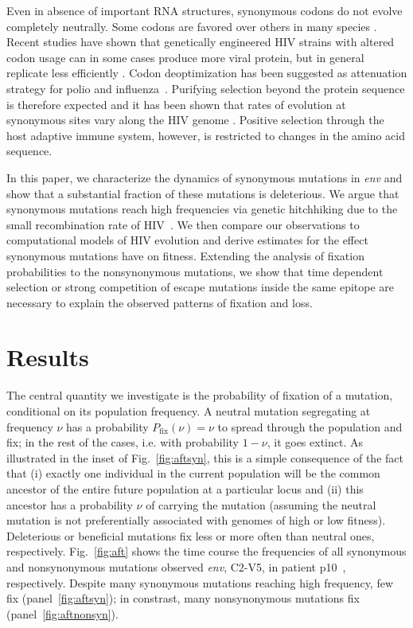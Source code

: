 \documentclass[rmp, twocolumn]{revtex4}
\newcommand{\pfix}{P_{\mathrm{fix}}}
\newcommand{\FIG}[1]{Fig.~\ref{fig:#1}}
\newcommand{\env}{\textit{env}}
\newcommand{\shankaregion}{C2-V5}
\begin{document}
Even in absence of important RNA structures, synonymous codons do not evolve
completely neutrally. Some codons are favored over others in many species
\citep{plotkin_synonymous_2011}. Recent studies have shown that genetically
engineered HIV strains with altered codon usage can in some cases produce more
viral protein, but in general replicate less efficiently
\citep{ngumbela_quantitative_2008, li_codon-usage-based_2012,
keating_rich_2009}. Codon deoptimization has been suggested as attenuation
strategy for polio and influenza~\citep{mueller_live_2010,coleman_virus_2008}.
Purifying selection beyond the protein sequence is therefore expected
\citep{forsdyke_reciprocal_1995,snoeck_mapping_2011} and it has been shown that
rates of evolution at synonymous sites vary along the HIV genome
\citep{mayrose_towards_2007}. Positive selection through the host adaptive
immune system, however, is restricted to changes in the amino acid sequence.

In this paper, we characterize the dynamics of synonymous mutations in \env{}
and show that a substantial fraction of these mutations is deleterious.  We
argue that synonymous mutations reach high frequencies via genetic hitchhiking
due to the small recombination rate of HIV~\citep{neher_recombination_2010,
batorsky_estimate_2011}. We then compare our observations to computational
models of HIV evolution and derive estimates for the effect synonymous mutations
have on fitness.  Extending the analysis of fixation probabilities to the
nonsynonymous mutations, we show that time dependent selection or strong
competition of escape mutations inside the same epitope are necessary to explain
the observed patterns of fixation and loss.

\section{Results}
The central quantity we investigate is the probability of fixation of a
mutation, conditional on its population frequency. A neutral mutation
segregating at frequency $\nu$ has a probability $\pfix(\nu) = \nu$ to
spread through the population and fix; in the rest of the cases, i.e. with
probability $1-\nu$, it goes extinct. As illustrated in the inset of
\FIG{aftsyn}, this is a simple consequence of the fact that (i) exactly one
individual in the current population will be the common ancestor of the entire
future population at a particular locus and (ii) this ancestor has a probability
$\nu$ of carrying the mutation (assuming the neutral mutation is not
preferentially associated with genomes of high or low fitness). Deleterious or
beneficial mutations fix less or more often than neutral ones, respectively.
\FIG{aft} shows the time course the frequencies of all synonymous and
nonsynonymous mutations observed \env, \shankaregion, in patient
p10~\citep{shankarappa_consistent_1999}, respectively. Despite many synonymous
mutations reaching high frequency, few fix (panel~\ref{fig:aftsyn}); in
constrast, many nonsynonymous mutations fix (panel~\ref{fig:aftnonsyn}).
\end{document}
